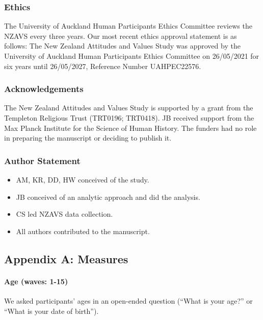 \documentclass[
  singlecolumn]{article}
\let\oldparagraph\paragraph
\renewcommand{\paragraph}[1]{\oldparagraph{#1}\mbox{}}
\providecommand{\tightlist}{%
  \setlength{\itemsep}{0pt}\setlength{\parskip}{0pt}}\usepackage{longtable,booktabs,array}
\begin{document}
\subsubsection{Ethics}\label{ethics}

The University of Auckland Human Participants Ethics Committee reviews
the NZAVS every three years. Our most recent ethics approval statement
is as follows: The New Zealand Attitudes and Values Study was approved
by the University of Auckland Human Participants Ethics Committee on
26/05/2021 for six years until 26/05/2027, Reference Number UAHPEC22576.

\subsubsection{Acknowledgements}\label{acknowledgements}

The New Zealand Attitudes and Values Study is supported by a grant from
the Templeton Religious Trust (TRT0196; TRT0418). JB received support
from the Max Planck Institute for the Science of Human History. The
funders had no role in preparing the manuscript or deciding to publish
it.

\subsubsection{Author Statement}\label{author-statement}

\begin{itemize}
\tightlist
\item
  AM, KR, DD, HW conceived of the study.
\item
  JB conceived of an analytic approach and did the analysis.
\item
  CS led NZAVS data collection.
\item
  All authors contributed to the manuscript.
\end{itemize}

\newpage{}

\subsection{Appendix A: Measures}\label{appendix-measures}

\paragraph{Age (waves: 1-15)}\label{age-waves-1-15}

We asked participants' ages in an open-ended question (``What is your
age?'' or ``What is your date of birth'').
\end{document}

